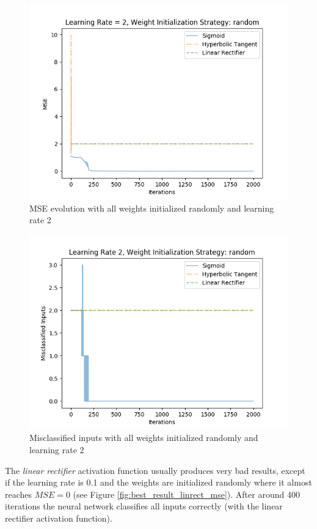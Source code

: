 \documentclass{article}
\begin{document}
\begin{figure}[H]
	\centering
	\includegraphics[width=0.9\linewidth]{img/5/sigmoid-mse.png}
	\caption{MSE evolution with all weights initialized randomly and learning rate 2}
	\label{fig:best_result_sigmoid_mse}
\end{figure}

\begin{figure}[H]
	\centering
	\includegraphics[width=0.9\linewidth]{img/5/sigmoid-inputs.png}
	\caption{Misclassified inputs with all weights initialized randomly and learning rate 2}
	\label{fig:best_result_sigmoid_inputs}
\end{figure}


The \emph{linear rectifier} activation function usually produces very bad results, except if the learning rate is 0.1 and the weights are initialized randomly where it almost reaches $MSE = 0$ (see Figure \ref{fig:best_result_linrect_mse}). After around 400 iterations the neural network classifies all inputs correctly (with the linear rectifier activation function).
\end{document}
